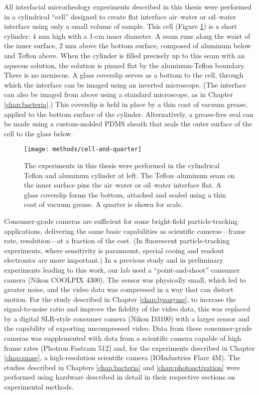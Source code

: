 All interfacial microrheology experiments described in this thesis were performed in a cylindrical ``cell'' designed to create flat interface air--water or oil--water interface using only a small volume of sample. This cell (Figure \ref{fig:cell-and-quarter}) is a short cylinder: 4 mm high with a 1-cm inner diameter. A seam runs along the waist of the inner surface, 2 mm above the bottom surface, composed of aluminum below and Teflon above. When the cylinder is filled precisely up to this seam with an aqueous solution, the solution is pinned flat by the aluminum-Teflon boundary. There is no meniscus. A glass coverslip serves as a bottom to the cell, through which the interface can be imaged using an inverted microscope. (The interface can also be imaged from above using a standard microscope, as in Chapter \ref{chap:bacteria}.) This coverslip is held in place by a thin coat of vacuum grease, applied to the bottom surface of the cylinder. Alternatively, a grease-free seal can be made using a custom-molded PDMS sheath that seals the outer surface of the cell to the glass below.

   \begin{figure}
    \centering
    \texttt{[image: methods/cell-and-quarter]}
    \caption{\label{fig:cell-and-quarter}The experiments in this thesis were performed in the cylindrical Teflon and aluminum cylinder at left. The Teflon--aluminum seam on the inner surface pins the air--water or oil--water interface flat. A glass coverslip forms the bottom, attached and sealed using a thin coat of vacuum grease. A quarter is shown for scale.}
    \end{figure}

Consumer-grade cameras are sufficient for some bright-field particle-tracking applications, delivering the same basic capabilities as scientific cameras---frame rate, resolution---at a fraction of the cost. (In fluorescent particle-tracking experiments, where sensitivity is paramount, special cooing and readout electronics are more important.) In a previous study and in preliminary experiments leading to this work, our lab used a ``point-and-shoot'' consumer camera (Nikon COOLPIX 4300). The sensor was physically small, which led to greater noise, and the video data was compressed in a way that can distort motion. For the study described in Chapter \ref{chap:lysozyme}, to increase the signal-to-noise ratio and improve the fidelity of the video data, this was replaced by a digital SLR-style consumer camera (Nikon D3100) with a larger sensor and the capability of exporting uncompressed video. Data from these consumer-grade cameras was supplemented with data from a scientific camera capable of high frame rates (Photron Fastcam 512) and, for the experiments described in Chapter \ref{chap:snase}, a high-resolution scientific camera (IOIndustries Flare 4M). The studies described in Chapters \ref{chap:bacteria} and \ref{chap:photoactivation} were performed using hardware described in detail in their respective sections on experimental methods.

